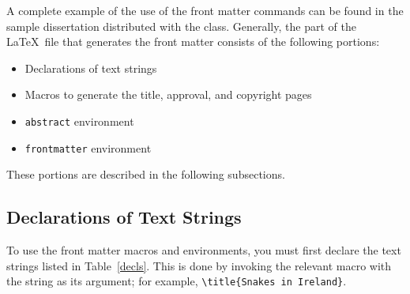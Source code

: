 \documentclass[11pt]{article}
\begin{document}
A complete example of the use of the front matter commands can be
found in the sample dissertation distributed with the class.
Generally, the part of the \LaTeX\ file that generates the front matter
consists of the following portions:
\begin{itemize}
\item Declarations of text strings
\item Macros to generate the title, approval, and copyright pages
\item \verb|abstract| environment
\item \verb|frontmatter| environment
\end{itemize}
These portions are described in the following subsections.

\subsection{Declarations of Text Strings}

To use the front matter macros and environments, you must first
declare the text strings listed in Table~\ref{decls}.  This is done
by invoking the relevant macro with the string as its argument;
for example, \lstinline|\title{Snakes in Ireland}|.
\end{document}
